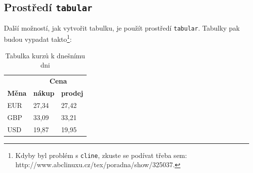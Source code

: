 \documentclass[a4paper, 11pt]{article}
\begin{document}
\subsection{Prostředí \texttt{tabular}}
Další možností, jak vytvořit tabulku, je použít prostředí \texttt{tabular}. Tabulky pak 
budou vypadat takto\footnote{Kdyby byl problém s \texttt{cline}, zkuste se podívat třeba sem:
http://www.abclinuxu.cz/tex/poradna/show/325037.}:
\begin{table}[h]
\centering
\begin{tabular}{|l|l|l|}
\hline
\textbf{}     & \multicolumn{2}{c|}{\textbf{Cena}} \\ \cline{2-3} 
\textbf{Měna} & \textbf{nákup}  & \textbf{prodej}  \\ \hline
EUR           & 27,34           & 27,42            \\
GBP           & 33,09           & 33,21            \\
USD           & 19,87           & 19,95            \\ \hline
\end{tabular}
\caption{Tabulka kurzů k dnešnímu dni}
\label{tab1}
\end{table}
\end{document}
